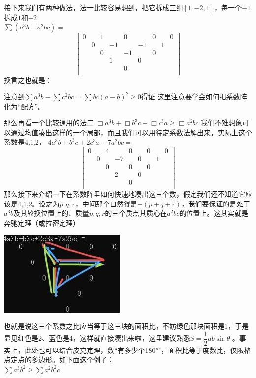 \documentclass[UTF8]{ctexart}
\begin{document}
接下来我们有两种做法，法一比较容易想到，把它拆成三组$ [1,-2,1] $，每一个$ -1 $拆成$ 1 $和$ -2 $\\
$ \displaystyle \sum (a^{3} b-a^{2} b c)= $
\renewcommand*{\arraystretch}{1.732}\[\left[\begin{matrix}
	0& &1& &0& &0& &0\\
	&0& &-1& &-1& &1&\\
	& &0& &-1& &0& &\\
	& & &1& &0& & &\\
	& & & &0& & & &\\
\end{matrix}\right]\]
换言之也就是：\\
\begin{center}
	注意到$ \displaystyle \sum a^{3} b-\displaystyle \sum a^{2} b c=\displaystyle \sum b c(a-b)^{2} \geq 0 $得证
	这里注意要学会如何把系数阵化为“配方”。
\end{center}
那么再看一个比较通用的法二
$ \Box a^{3} b+\Box b^{3} c+\Box c^{3} a \geq \Box a^{2} b c $
我们不难想象可以通过均值凑出这样的一个局部，而且我们可以用待定系数法解出来，实际上这个系数是4,1,2，
$ 4a^{3}b+b^{3}c+2c^{3}a-7a^{2}bc= $\\
\renewcommand*{\arraystretch}{1.732}\[\left[\begin{matrix}
	0& &4& &0& &0& &0\\
	& 0& &-7& &0& &1&\\
	& &0& &0& &0& &\\
	& & &2& &0& & &\\
	& & & &0& & & &\\
\end{matrix}\right]\]
那么接下来介绍一下在系数阵里如何快速地凑出这三个数，假定我们还不知道它应该是4,1,2。设之为$ p,q,r $，中间那个自然得是$ -(p+q+r) $，我们要保证的是处于$ a^{3}b $及其轮换位置上的、质量$ p,q,r $的三个质点其质心在$ a^{2}bc $的位置上。这其实就是奔驰定理（或拉密定理）

\begin{center}
	\includegraphics[width=0.4\linewidth]{13}
\end{center}

也就是说这三个系数之比应当等于这三块的面积比，不妨绿色那块面积是1，于是显见红色是2、蓝色是4，这样就直接凑出来啦，这里建议熟悉$ S=\displaystyle \dfrac{1}{2}ab  \sin \theta $
。事实上，此处也可以结合皮克定理，数“有多少个180°”，面积比等于度数比，仅限格点定点的多边形。如下面这个例子：\\
$ \displaystyle  \sum a^{3} b^{2} \geq \displaystyle  \sum a^{2} b^{2} c $
\end{document}

